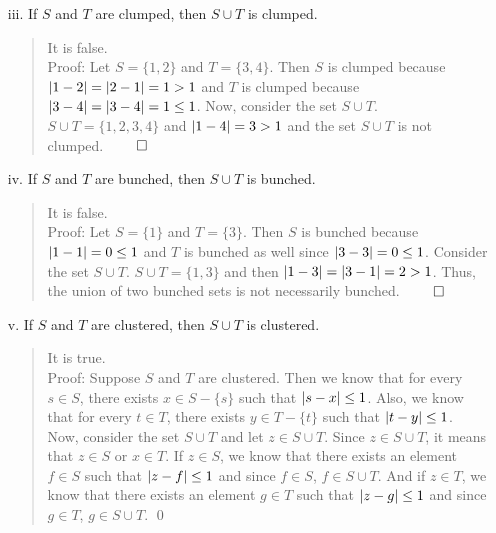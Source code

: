 \documentclass[12pt, a4paper]{article}                      %
\DeclarePairedDelimiter\abs{\lvert}{\rvert}
\begin{document}
\begin{itemize}
\begin{itemize}
\begin{itemize}
\item[]

\item[iii.]
If $S$ and $T$ are clumped, then $S \cup T$ is clumped.
\begin{quote}
It is false.\\
Proof: Let $S = \{1, 2\}$ and $T = \{3, 4\}$. Then $S$ is clumped because $\abs{1 - 2} = \abs{2 - 1} = 1 > 1$
and $T$ is clumped because $\abs{3 - 4} = \abs{3 - 4} = 1 \leq 1$. Now, consider the set $S \cup T$.
$S \cup T = \{1, 2, 3, 4\}$ and $\abs{1 - 4} = 3 > 1$ and the set $S \cup T$ is not clumped. $\qed$
\end{quote}
\item[]
\item[iv.]
If $S$ and $T$ are bunched, then $S \cup T$ is bunched.
\begin{quote}
It is false.\\
Proof: Let $S = \{1\}$ and $T = \{3\}$. Then $S$ is bunched because $\abs{1 - 1} = 0 \leq 1$
and $T$ is bunched as well since $\abs{3 - 3} = 0 \leq 1$. Consider the set $S \cup T$.
$S \cup T = \{1, 3\}$ and then $\abs{1 - 3} = \abs{3 - 1} = 2 > 1$. Thus, the union of two bunched
sets is not necessarily bunched. $\qed$
\end{quote}
\item[]
\item[v.]
If $S$ and $T$ are clustered, then $S \cup T$ is clustered.
\begin{quote}
It is true.\\
Proof: Suppose $S$ and $T$ are clustered. Then we know that for every $s \in S$, there exists $x \in S - \{s\}$
such that $\abs{s - x} \leq 1$. Also, we know that for every $t \in T$, there exists $y \in T - \{t\}$ such that $\abs{t - y} \leq 1$.
Now, consider the set $S \cup T$ and let $z \in S \cup T$. Since $z \in S \cup T$, it means that $z \in S$ or $x \in T$.
If $z \in S$, we know that there exists an element $f \in S$ such that $\abs{z - f} \leq 1$ and since $f \in S$, $f \in S \cup T$.
And if $z \in T$, we know that there exists an element $g \in T$ such that $\abs{z - g} \leq 1$ and since $g \in T$, $g \in S \cup T$.
\qed
\end{quote}
\end{itemize}


\end{itemize}
\end{itemize}
\end{document}
